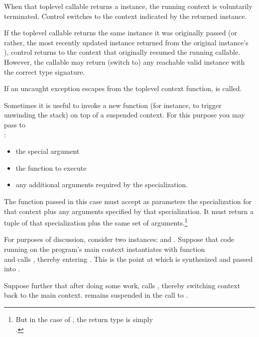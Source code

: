 When that toplevel callable returns a \ectx instance, the running context is
voluntarily terminated. Control switches to the context indicated by the
returned \ectx instance.

If the toplevel callable returns the same \ectx instance it was originally
passed (or rather, the most recently updated instance returned from the
original instance's \op), control returns to the context that originally
resumed the running callable. However, the callable may return (switch to)
any reachable valid \ectx instance with the correct type signature.


If an uncaught exception escapes from the toplevel context function,
 is called.


Sometimes it is useful to invoke a new function (for instance, to trigger
unwinding the stack) on top of a suspended context. For this purpose you may
pass to\\
\ectxop:

\begin{itemize}
  \item the special argument 
  \item the function to execute
  \item any additional arguments required by the \ectx specialization.
\end{itemize}

The function passed in this case must accept as parameters the \ectx
specialization for that context plus any arguments specified by that
specialization. It must return a tuple of that \ectx specialization plus the
same set of arguments.\footnote{But in the case
of , the return type is
simply\\.}

For purposes of discussion, consider two 
instances:  and . Suppose that code running
on the program's main context instantiates  with function\\
 and calls , thereby
entering . This is the point at which  is synthesized
and passed into .

Suppose further that after doing some work,  calls ,
thereby switching context back to the main context.  remains
suspended in the call to .

